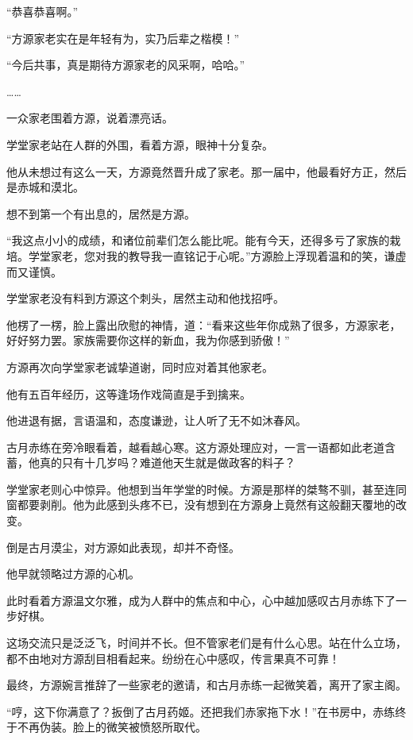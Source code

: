 
\begin{this_body}



“恭喜恭喜啊。”

“方源家老实在是年轻有为，实乃后辈之楷模！”

“今后共事，真是期待方源家老的风采啊，哈哈。”

……

一众家老围着方源，说着漂亮话。

学堂家老站在人群的外围，看着方源，眼神十分复杂。

他从未想过有这么一天，方源竟然晋升成了家老。那一届中，他最看好方正，然后是赤城和漠北。

想不到第一个有出息的，居然是方源。

“我这点小小的成绩，和诸位前辈们怎么能比呢。能有今天，还得多亏了家族的栽培。学堂家老，您对我的教导我一直铭记于心呢。”方源脸上浮现着温和的笑，谦虚而又谨慎。

学堂家老没有料到方源这个刺头，居然主动和他找招呼。

他楞了一楞，脸上露出欣慰的神情，道：“看来这些年你成熟了很多，方源家老，好好努力罢。家族需要你这样的新血，我为你感到骄傲！”

方源再次向学堂家老诚挚道谢，同时应对着其他家老。

他有五百年经历，这等逢场作戏简直是手到擒来。

他进退有据，言语温和，态度谦逊，让人听了无不如沐春风。

古月赤练在旁冷眼看着，越看越心寒。这方源处理应对，一言一语都如此老道含蓄，他真的只有十几岁吗？难道他天生就是做政客的料子？

学堂家老则心中惊异。他想到当年学堂的时候。方源是那样的桀骜不驯，甚至连同窗都要剥削。他为此感到头疼不已，没有想到在方源身上竟然有这般翻天覆地的改变。

倒是古月漠尘，对方源如此表现，却并不奇怪。

他早就领略过方源的心机。

此时看着方源温文尔雅，成为人群中的焦点和中心，心中越加感叹古月赤练下了一步好棋。

这场交流只是泛泛飞，时间并不长。但不管家老们是有什么心思。站在什么立场，都不由地对方源刮目相看起来。纷纷在心中感叹，传言果真不可靠！

最终，方源婉言推辞了一些家老的邀请，和古月赤练一起微笑着，离开了家主阁。

“哼，这下你满意了？扳倒了古月药姬。还把我们赤家拖下水！”在书房中，赤练终于不再伪装。脸上的微笑被愤怒所取代。


\end{this_body}
